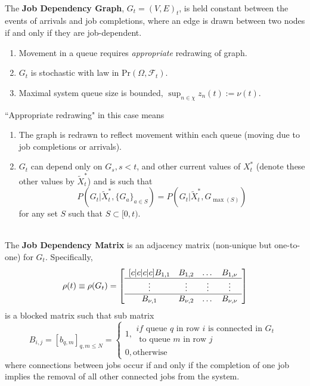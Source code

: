\begin{definition}
    \hfill \\
    The \textbf{Job Dependency Graph}, $G_{t}=(V,E)_{t}$, is held constant between the events of arrivals and job completions, where an edge is drawn between two nodes if and only if they are job-dependent.

    \begin{enumerate}
        \item Movement in a queue requires \textit{appropriate} redrawing of graph.
        \item $G_{t}$ is stochastic with law in $\text{Pr}(\Omega, \mathcal{F}_{t})$.
        \item Maximal system queue size is bounded, $\sup_{n \in \chi}z_{n}(t):=\nu(t).$
    \end{enumerate}
    ``Appropriate redrawing" in this case means
    \begin{enumerate}
        \item The graph is redrawn to reflect movement within each queue (moving due to job completions or arrivals).
        \item $G_{t}$ can depend only on $G_{s}, s <t$, and other current values of $X^{*}_{t}$ (denote these other values by $\tilde X^{*}_{t}$) and is such that \[P(G_{t}|\tilde X^{*}_{t}, \{G_{a}\}_{a \in S})=P(G_{t}|\tilde X^{*}_{t}, G_{\max(S)})\]
        for any set $S$ such that $ S \subset [0,t)$.
    \end{enumerate}
    \label{dep1}
\end{definition}
\begin{definition}
    \hfill \\
    The \textbf{Job Dependency Matrix} is an adjacency matrix (non-unique but one-to-one) for $G_{t}$. Specifically,
    \begin{align}
        \rho(t)\equiv \rho(G_{t})=
        \left[  \enskip
        \begin{matrix}[c|c|c|c]
            B_{1,1}  & B_{1,2}  & \dots & B_{1,\nu}\\
            \hline
            \vdots & \vdots & \vdots &\vdots  \\
            \hline
            B_{\nu,1}  & B_{\nu,2} & \dots   & B_{\nu,\nu}\\
        \end{matrix} \enskip \right]
        \label{rho}
    \end{align}
    is a blocked matrix such that sub matrix
    \[B_{i,j}= [b_{q,m}]_{q,m \leq N} = \begin{cases}
                                            1, \substack{if \text{ queue } q \text{ in row } i \text{ is connected in } G_{t} \\ \text{ to queue } m \text{ in row } j}\\
                                            0, \text{otherwise}
    \end{cases}\]
    where connections between jobs occur if and only if the completion of one job implies the removal of all other connected jobs from the system.
    \label{jdf}
\end{definition}

